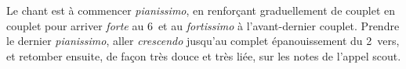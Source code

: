 


\vfill{}
{\footnotesize Le chant est à commencer \emph{pianissimo}, en
renforçant graduellement de couplet en couplet pour arriver \emph{forte}
au 6\ieme\ et au \emph{fortissimo} à l'avant-dernier couplet. Prendre le
dernier \emph{pianissimo}, aller \emph{crescendo} jusqu'au complet
épanouissement du 2\ieme\ vers, et retomber ensuite, de façon très douce
et très liée, sur les notes de l'appel scout.}
